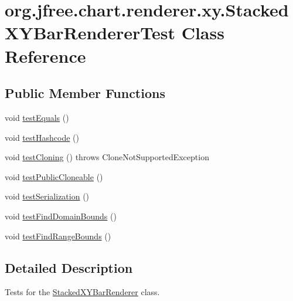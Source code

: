 \hypertarget{classorg_1_1jfree_1_1chart_1_1renderer_1_1xy_1_1_stacked_x_y_bar_renderer_test}{}\section{org.\+jfree.\+chart.\+renderer.\+xy.\+Stacked\+X\+Y\+Bar\+Renderer\+Test Class Reference}
\label{classorg_1_1jfree_1_1chart_1_1renderer_1_1xy_1_1_stacked_x_y_bar_renderer_test}
\subsection*{Public Member Functions}
\begin{DoxyCompactItemize}
\item 
void \mbox{\hyperlink{classorg_1_1jfree_1_1chart_1_1renderer_1_1xy_1_1_stacked_x_y_bar_renderer_test_aac134bb22a8abfc29ab44513fcfa8830}{test\+Equals}} ()
\item 
void \mbox{\hyperlink{classorg_1_1jfree_1_1chart_1_1renderer_1_1xy_1_1_stacked_x_y_bar_renderer_test_ad9dc513bb549347fe0a3f5b55e4b8af4}{test\+Hashcode}} ()
\item 
void \mbox{\hyperlink{classorg_1_1jfree_1_1chart_1_1renderer_1_1xy_1_1_stacked_x_y_bar_renderer_test_ac6f3e2ee34cffc50b353a50672b5a709}{test\+Cloning}} ()  throws Clone\+Not\+Supported\+Exception 
\item 
void \mbox{\hyperlink{classorg_1_1jfree_1_1chart_1_1renderer_1_1xy_1_1_stacked_x_y_bar_renderer_test_a48f38262b40975b95f97d93fb25b3145}{test\+Public\+Cloneable}} ()
\item 
void \mbox{\hyperlink{classorg_1_1jfree_1_1chart_1_1renderer_1_1xy_1_1_stacked_x_y_bar_renderer_test_adbd04a29393e18987f7ec3ec20dd8876}{test\+Serialization}} ()
\item 
void \mbox{\hyperlink{classorg_1_1jfree_1_1chart_1_1renderer_1_1xy_1_1_stacked_x_y_bar_renderer_test_a056ae7b3aefc954a42b4c3a200280468}{test\+Find\+Domain\+Bounds}} ()
\item 
void \mbox{\hyperlink{classorg_1_1jfree_1_1chart_1_1renderer_1_1xy_1_1_stacked_x_y_bar_renderer_test_a8383a755c033adfb6c7bb5501e243b88}{test\+Find\+Range\+Bounds}} ()
\end{DoxyCompactItemize}


\subsection{Detailed Description}
Tests for the \mbox{\hyperlink{classorg_1_1jfree_1_1chart_1_1renderer_1_1xy_1_1_stacked_x_y_bar_renderer}{Stacked\+X\+Y\+Bar\+Renderer}} class. 

